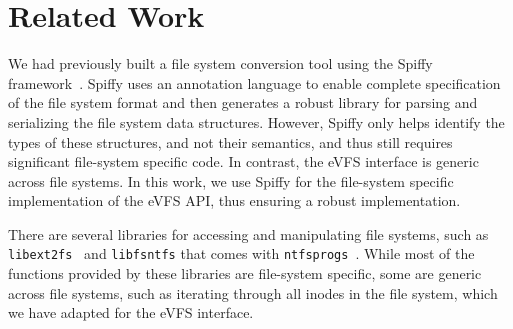 \vspace{-0.7em}
\section{Related Work\label{sec:Related_Work}}
\vspace{-0.4em}

We had previously built a file system conversion tool using the Spiffy framework~\cite{sun2018spiffy}. Spiffy uses an annotation language to enable complete specification of the file system format and then generates a robust library for parsing and serializing the file system data structures. However, Spiffy only helps identify the types of these structures, and not their semantics, and thus still requires significant file-system specific code. In contrast, the eVFS interface is generic across file systems. In this work, we use Spiffy for the file-system specific implementation of the eVFS API, thus ensuring a robust implementation.


There are several libraries for accessing and manipulating file systems, such as \texttt{libext2fs}~\cite{tso-e2fsprogs} and \texttt{libfsntfs} that comes with \texttt{ntfsprogs}~\cite{mathes2007ntfs}. While most of the functions provided by these libraries are file-system specific, some are generic across file systems, such as iterating through all inodes in the file system, which we have adapted for the eVFS interface.

